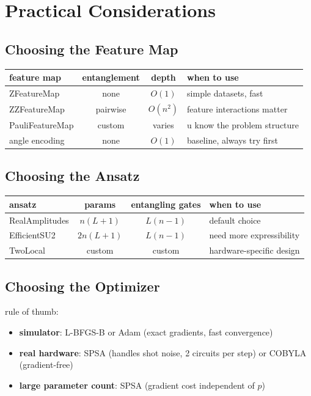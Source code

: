 \documentclass[11pt,a4paper]{article}
\theoremstyle{definition}
\theoremstyle{remark}
\begin{document}
\section{Practical Considerations}

\subsection{Choosing the Feature Map}

\begin{center}
\begin{tabular}{l|c|c|l}
\textbf{feature map} & \textbf{entanglement} & \textbf{depth} & \textbf{when to use} \\
\hline
ZFeatureMap & none & $O(1)$ & simple datasets, fast \\
ZZFeatureMap & pairwise & $O(n^2)$ & feature interactions matter \\
PauliFeatureMap & custom & varies & u know the problem structure \\
angle encoding & none & $O(1)$ & baseline, always try first
\end{tabular}
\end{center}

\subsection{Choosing the Ansatz}

\begin{center}
\begin{tabular}{l|c|c|l}
\textbf{ansatz} & \textbf{params} & \textbf{entangling gates} & \textbf{when to use} \\
\hline
RealAmplitudes & $n(L+1)$ & $L(n-1)$ & default choice \\
EfficientSU2 & $2n(L+1)$ & $L(n-1)$ & need more expressibility \\
TwoLocal & custom & custom & hardware-specific design
\end{tabular}
\end{center}

\subsection{Choosing the Optimizer}

rule of thumb:
\begin{itemize}
    \item \textbf{simulator}: L-BFGS-B or Adam (exact gradients, fast convergence)
    \item \textbf{real hardware}: SPSA (handles shot noise, 2 circuits per step) or COBYLA (gradient-free)
    \item \textbf{large parameter count}: SPSA (gradient cost independent of $p$)
\end{itemize}
\end{document}
